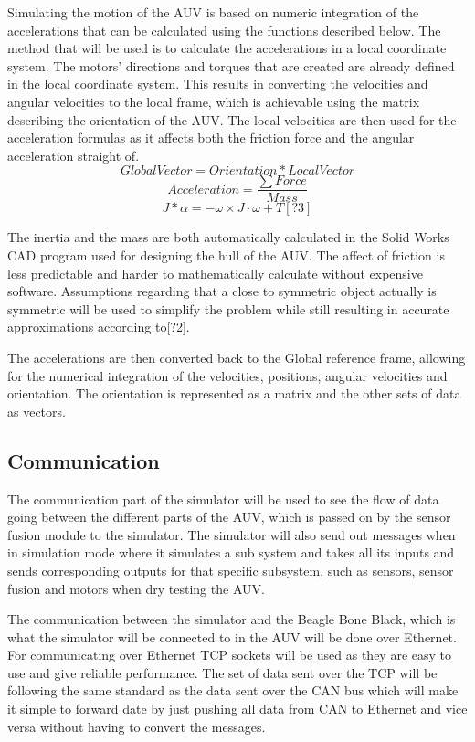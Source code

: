 Simulating the motion of the AUV is based on numeric integration of the accelerations that can be calculated using the functions described below. The method that will be used is to calculate the accelerations in a local coordinate system. The motors' directions and torques that are created are already defined in the local coordinate system. This results in converting the velocities and angular velocities to the local frame, which is achievable using the matrix describing the orientation of the AUV. The local velocities are then used for the acceleration formulas as it affects both the friction force and the angular acceleration straight of.
\begin{equation}
Global Vector = Orientation*Local Vector
\end{equation}
\begin{equation}
Acceleration = \frac{\sum Force}{Mass}
\end{equation}
\begin{equation}
J*\alpha = - \omega \times J \cdot\omega + T [?3]
\end{equation}

The inertia and the mass are both automatically calculated in the Solid Works CAD program used for designing the hull of the AUV. The affect of friction is less predictable and harder to mathematically calculate without expensive software. Assumptions regarding that a close to symmetric object actually is symmetric will be used to simplify the problem while still resulting in accurate approximations according to[?2].

The accelerations are then converted back to the Global reference frame, allowing for the numerical integration of the velocities, positions, angular velocities and orientation. The orientation is represented as a matrix and the other sets of data as vectors.
\subsection{Communication}

The communication part of the simulator will be used to see the flow of data going between the different parts of the AUV, which is passed on by the sensor fusion module to the simulator. The simulator will also send out messages when in simulation mode where it simulates a sub system and takes all its inputs and sends corresponding outputs for that specific subsystem, such as sensors, sensor fusion and motors when dry testing the AUV.

The communication between the simulator and the Beagle Bone Black, which is what the simulator will be connected to in the AUV will be done over Ethernet. For communicating over Ethernet TCP sockets will be used as they are easy to use and give reliable performance. The set of data sent over the TCP will be following the same standard as the data sent over the CAN bus which will make it simple to forward date by just pushing all data from CAN to Ethernet and vice versa without having to convert the messages.


